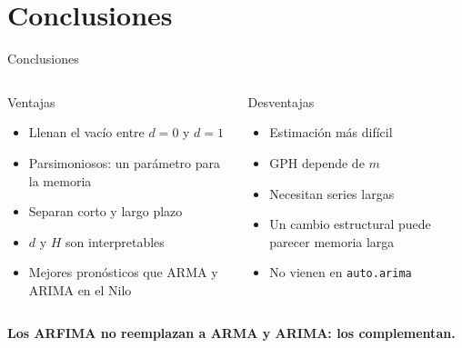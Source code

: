 \documentclass[aspectratio=169,11pt]{beamer}
\begin{document}
\section{Conclusiones}
\begin{frame}{Conclusiones}
\begin{columns}[T]
\begin{block}{Ventajas}
\begin{itemize}
\item Llenan el vacío entre $d=0$ y $d=1$
\item Parsimoniosos: un parámetro para la memoria
\item Separan corto y largo plazo
\item $d$ y $H$ son interpretables
\item Mejores pronósticos que ARMA y ARIMA en el Nilo
\end{itemize}
\end{block}
\begin{alertblock}{Desventajas}
\begin{itemize}
\item Estimación más difícil
\item GPH depende de $m$
\item Necesitan series largas
\item Un cambio estructural puede parecer memoria larga
\item No vienen en \texttt{auto.arima}
\end{itemize}
\end{alertblock}
\end{columns}
\vspace{0.3cm}
\centering
\textbf{Los ARFIMA no reemplazan a ARMA y ARIMA: los complementan.}
\end{frame}
\end{document}
